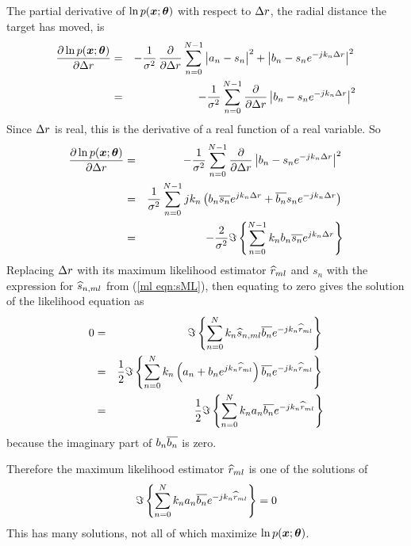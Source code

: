 The partial derivative of $\ln p(\bm{x};\bm{\theta})$ with respect to ${\Delta r}$, the
radial distance the target has moved, is 
\begin{eqnarray}
\frac{\del\ln p(\md;\uvp)}{\del \dr}
&=&-\frac{1}{\nv}\,\frac{\del}{\del \dr}\sum_{n=0}^{N-1}
\left|\vphantom{\e{k}}a_n-s_n\right|^2+\left|b_n-s_n\e{-jk_n\dr}\right|^2\nn\\
&=&-\frac{1}{\nv}\sum_{n=0}^{N-1}\frac{\del}{\del \dr}
\left|b_n-s_n\e{-jk_n\dr}\right|^2
\end{eqnarray}
Since ${\Delta r}$ is real, this is the derivative of a real function of a real
variable.  So
\begin{eqnarray}
\frac{{\partial}\ln p(\bm{x};\bm{\theta})}{{\partial} {\Delta r}}
&=&-\frac{1}{{\sigma^2}}\sum_{n=0}^{N-1}\frac{{\partial}}{{\partial} {\Delta r}}
\left|b_n-s_n{e^{-jk_n{\Delta r}}}\right|^2{\nonumber}\\
&=&\frac{1}{{\sigma^2}}\sum_{n=0}^{N-1}jk_n\left(
b_n\overline{s_n}{e^{jk_n{\Delta r}}}+\overline{b_n}s_n{e^{-jk_n{\Delta r}}}\right){\nonumber}\\
&=&-\frac{2}{{\sigma^2}}\Im\left\{\sum_{n=0}^{N-1}k_nb_n\overline{s_n}{e^{jk_n{\Delta r}}}\right\}
\end{eqnarray}
Replacing ${\Delta r}$ with its maximum likelihood estimator $\widehat{r}_{ml}$ and $s_n$ with
the expression for $\widehat{s}_{n,ml}$ from (\ref{ml eqn:sML}), then equating to zero
gives the solution of the likelihood equation as
\begin{eqnarray}
0&=&\Im\left\{\sum_{n=0}^{N} k_n\widehat{s}_{n,ml}\overline{b_n}{e^{-jk_n\widehat{r}_{ml}}}\right\}{\nonumber}\\
&=&\frac{1}{2}\Im\left\{\sum_{n=0}^{N} k_n\left(a_n+b_n{e^{jk_n\widehat{r}_{ml}}}\right)
\overline{b_n}{e^{-jk_n\widehat{r}_{ml}}}\right\}{\nonumber}\\
&=&\frac{1}{2}\Im\left\{\sum_{n=0}^{N} k_na_n\overline{b_n}{e^{-jk_n\widehat{r}_{ml}}}\right\}
\end{eqnarray}
because the imaginary part of $b_n\overline{b_n}$ is zero.

Therefore the maximum likelihood estimator $\widehat{r}_{ml}$ is one of the solutions of 
\begin{equation}
\Im\left\{\sum_{n=0}^{N} k_na_n\overline{b_n}{e^{-jk_n\widehat{r}_{ml}}}\right\}=0
\end{equation}
This has many solutions, not all of which maximize $\ln p(\bm{x};\bm{\theta})$.

